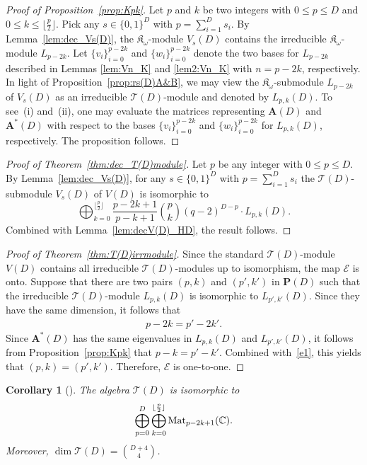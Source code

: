 \documentclass[10pt,a4paper]{amsart}
\def\A{\mathbf A}
\def\C{\mathbb C}
\def\K{\mathfrak K_\omega}
\def\Mat{{\rm Mat}}
\def\T{\mathcal T}
\numberwithin{equation}{section}
\newtheorem{Corollary}[Theorem]{Corollary}
\begin{document}
\begin{proof}[Proof of Proposition~\ref{prop:Kpk}]
Let $p$ and $k$ be two integers with $0\leq p\leq D$ and $0\leq k\leq \lfloor \frac{p}{2}\rfloor$. Pick any $s\in \{0,1\}^D$ with $p=\sum_{i=1}^D s_i$.
By Lemma~\ref{lem:dec_Vs(D)}, the $\K$-module $V_s(D)$ contains the irreducible $\K$-module $L_{p-2k}$. Let $\{v_i\}_{i=0}^{p-2k}$ and $\{w_i\}_{i=0}^{p-2k}$ denote the two bases for $L_{p-2k}$ described in Lemmas \ref{lem:Vn_K} and \ref{lem2:Vn_K} with $n=p-2k$, respectively. In light of Proposition~\ref{prop:rs(D)A&B}, we may view the $\K$-submodule $L_{p-2k}$ of $V_s(D)$ as an irreducible $\T(D)$-module and denoted by $L_{p,k}(D)$.
To see~(i) and~(ii), one may evaluate the matrices representing $\A(D)$ and $\A^*(D)$ with respect to the bases $\{v_i\}_{i=0}^{p-2k}$ and $\{w_i\}_{i=0}^{p-2k}$ for $L_{p,k}(D)$, respectively. The proposition follows.
\end{proof}


\begin{proof}[Proof of Theorem~\ref{thm:dec_T(D)module}]
Let $p$ be any integer with $0\leq p\leq D$.
By Lemma~\ref{lem:dec_Vs(D)}, for any $s\in \{0,1\}^D$ with $p=\sum_{i=1}^D s_i$ the $\T(D)$-submodule $V_s(D)$ of $V(D)$ is isomorphic to
\[
\bigoplus_{k=0}^{\lfloor \frac{p}{2}\rfloor}
\frac{p-2k+1}{p-k+1}{p\choose k}(q-2)^{D-p}\cdot L_{p,k}(D).
\]
Combined with Lemma~\ref{lem:decV(D)_HD}, the result follows.
\end{proof}

\begin{proof}[Proof of Theorem~\ref{thm:T(D)irrmodule}]
Since the standard $\T(D)$-module $V(D)$ contains all irreducible \linebreak $\T(D)$-modules up to isomorphism,
 the map $\mathcal E$ is onto.
 Suppose that there are two pairs $(p,k)$ and $(p',k')$ in $\mathbf P(D)$ such that the irreducible $\T(D)$-module $L_{p,k}(D)$ is isomorphic to $L_{p',k'}(D)$. Since they have the same dimension, it follows that
\begin{gather}\label{e1}
p-2k=p'-2k'.
\end{gather}
Since $\A^*(D)$ has the same eigenvalues in $L_{p,k}(D)$ and $L_{p',k'}(D)$,
it follows from Proposition~\ref{prop:Kpk} that $p-k=p'-k'$.
Combined with~\eqref{e1}, this yields that $(p,k)=(p',k')$. Therefore, $\mathcal E$ is one-to-one.
\end{proof}


\begin{Corollary}[{\cite[Corollary 3.7]{Hamming2006}}]\label{cor:dimT(D)}
The algebra $\T(D)$ is isomorphic to
\[
\bigoplus_{p=0}^D
\bigoplus_{k=0}^{\lfloor \frac{p}{2}\rfloor}
\Mat_{p-2k+1}(\C).
\]
Moreover, $\dim \T(D)={D+4\choose 4}$.
\end{Corollary}
\end{document}
